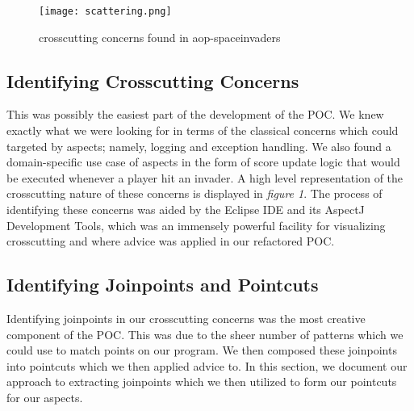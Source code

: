 \documentclass[sigconf]{acmart}
\begin{document}
 \begin{figure}
    \centering
    \texttt{[image: scattering.png]}
    \caption{crosscutting concerns found in aop-spaceinvaders}
    \label{fig:1}
\end{figure}

\subsection{Identifying Crosscutting Concerns}
This was possibly the easiest part of the development of the POC. We knew exactly what we were looking for in terms of the classical concerns which could targeted by aspects; namely, logging and exception handling. We also found a domain-specific use case of aspects in the form of score update logic that would be executed whenever a player hit an invader. A high level representation of the crosscutting nature of these concerns is displayed in \textit{figure 1}. The process of identifying these concerns was aided by the Eclipse IDE and its AspectJ Development Tools, which was an immensely powerful facility for visualizing crosscutting and where advice was applied in our refactored POC.

\subsection{Identifying Joinpoints and Pointcuts}
Identifying joinpoints in our crosscutting concerns was the most creative component of the POC. This was due to the sheer number of patterns which we could use to match points on our program. We then composed these joinpoints into pointcuts which we then applied advice to. In this section, we document our approach to extracting joinpoints which we then utilized to form our pointcuts for our aspects.
\end{document}
